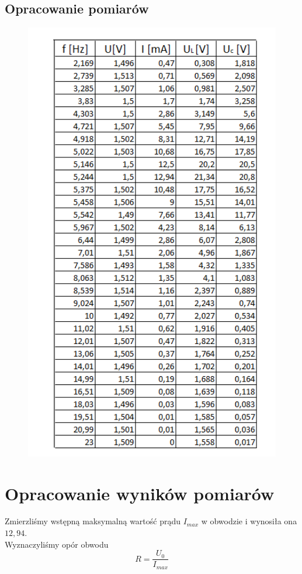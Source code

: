 \documentclass{article}
\begin{document}
\subsection{Opracowanie pomiarów}
\begin{figure}
\centering
\includegraphics[width=12cm]{tabela.png}
\end{figure}
\newpage

\section{Opracowanie wyników pomiarów}
Zmierzliśmy wstępną maksymalną wartość prądu $I_{max}$ w obwodzie i wynosiła ona $12,94$.
$$$$
Wyznaczyliśmy opór obwodu
$$R = \frac{U_0}{I_{max}}$$
\end{document}
